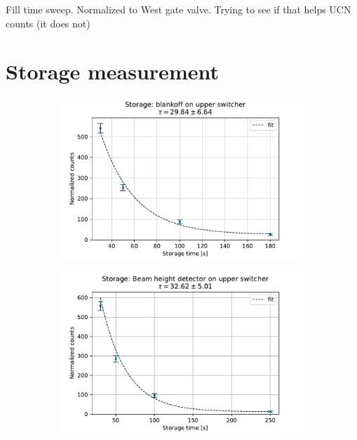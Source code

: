 Fill time sweep. Normalized to West gate valve. Trying to see if that helps UCN counts (it does not)


\section{Storage measurement}


\begin{figure}
\centering
\begin{subfigure}{.5\textwidth} 
  \centering
  \includegraphics[width=\textwidth]{figures/store_blankoff_fit.pdf}
  \caption{}\label{subfig:2022_storage_blankoff}
\end{subfigure}%
\begin{subfigure}{.5\textwidth}
  \centering
  \includegraphics[width=\textwidth]{figures/store_with_beam_height_det_fit.pdf}

\end{subfigure}
\end{figure}
